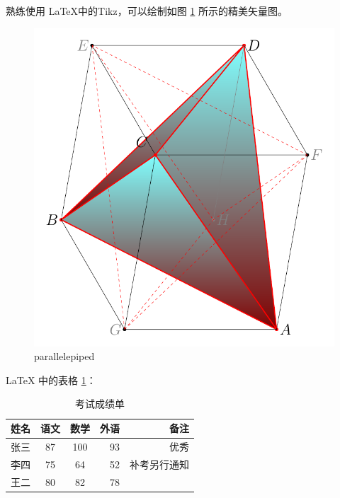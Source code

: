 \documentclass{ctexart}
\begin{document}
    熟练使用 \LaTeX 中的Tikz，可以绘制如图 \ref{fig-parallelepiped} 所示的精美矢量图。
    \begin{figure}[htbp]
        \centering
        \includegraphics[scale=0.2]{parallelepiped.pdf}
        \caption{parallelepiped} \label{fig-parallelepiped}
    \end{figure}

    \LaTeX{} 中的表格 \ref{tab-score}：
    \begin{table}[htbp]
        \centering
        \caption{考试成绩单} \label{tab-score}
        \begin{tabular}{|l||c|c|r|r|}
            \hline
            姓名 & 语文 & 数学 & 外语 & 备注 \\
            \hline \hline
            张三 & 87 & 100 & 93 & 优秀 \\
            \hline
            李四 & 75 & 64 & 52 & 补考另行通知 \\
            \hline
            王二 & 80 & 82 & 78 & \\
            \hline
        \end{tabular}
    \end{table}
    
\end{document}
